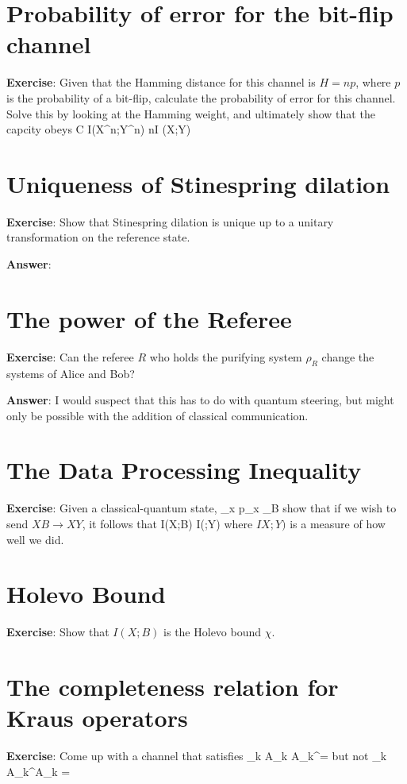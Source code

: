 \section{Probability of error for the bit-flip channel}
\textbf{Exercise}: Given that the Hamming distance for this channel is $H = 	np$, where $p$ is the probability of a bit-flip, calculate the probability of error for this channel. Solve this by looking at the Hamming weight, and ultimately show that the capcity obeys
\beq
C \leq I(X^n;Y^n) \leq nI (X;Y)
\eeq



\section{Uniqueness of Stinespring dilation}
\textbf{Exercise}: Show that Stinespring dilation is unique up to a unitary transformation on the reference state. 

\textbf{Answer}:

\section{The power of the Referee}
\textbf{Exercise}: Can the referee $R$ who holds the purifying system $\rho_R$ change the systems of Alice and Bob? 

\textbf{Answer}: I would suspect that this has to do with quantum steering, but might only be possible with the addition of classical communication. 


\section{The Data Processing Inequality}
\textbf{Exercise}: Given a classical-quantum state, 
\beq
\sum_x p_x  \otimes \rho_B
\eeq
show that if we wish to send $XB \rightarrow XY$, it follows that 
\beq
I(X;B) \geq I(;Y)
\eeq
where $IX;Y)$ is a measure of how well we did. 

\section{Holevo Bound}
\textbf{Exercise}: Show that $I(X;B)$ is the Holevo bound $\chi$. 

\section{The completeness relation for Kraus operators}
\textbf{Exercise}: Come up with a channel that satisfies
\beq
\sum_k A_k A_k^\dagger = \identity
\eeq
but not
\beq
\sum_k A_k^\dagger A_k = \identity
\eeq

